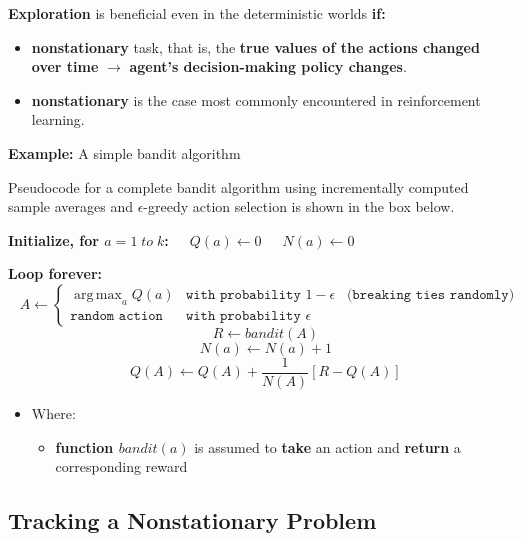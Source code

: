 \documentclass[12pt, a4paper]{article}
\DeclareMathOperator*{\argmax}{arg\,max} %
\begin{document}
\textbf{Exploration} is beneficial even in the deterministic worlds
\textbf{if:}
\begin{itemize}
  \item \textbf{nonstationary} task, that is, the \textbf{true
  values of the actions changed over time} \(\rightarrow\) \textbf{agent's
  decision-making policy changes}.
  \item \textbf{nonstationary} is the case most commonly encountered in reinforcement learning.
\end{itemize}

\textbf{Example:} A simple bandit algorithm

Pseudocode for a complete bandit algorithm using incrementally computed
sample averages and \(\epsilon\)-greedy action selection is shown in the
box below.

\begin{tcolorbox}
  \textbf{Initialize, for \(a = 1 \; to \; k\):} \(\;\;\;\)
  \(Q(a) \leftarrow 0\) \(\;\;\;\) \(N(a) \leftarrow 0\)

  \textbf{Loop forever:}
  $$\;\;\; A \leftarrow \begin{cases} \argmax_{a}Q(a) &\texttt{with probability } 1- \epsilon \;\;\; \texttt{(breaking ties randomly)} \\ \texttt{random action} &\texttt{with probability } \epsilon \end{cases}$$
  $$\;\;\; R \leftarrow bandit(A)$$
  $$\;\;\; N(a) \leftarrow N(a)+1$$
  $$\;\;\; Q(A) \leftarrow Q(A) + \frac{1}{N(A)}[R-Q(A)]$$
\end{tcolorbox}

\begin{itemize}
\item
  Where:

  \begin{itemize}
  \item
    \textbf{function \(bandit(a)\)} is assumed to \textbf{take} an
    action and \textbf{return} a corresponding reward
  \end{itemize}
\end{itemize}









\subsection{Tracking a Nonstationary Problem}\label{tracking-nonstationary-problem}
\end{document}
